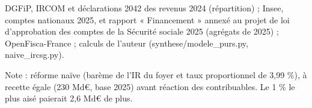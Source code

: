 DGFiP, IRCOM et déclarations 2042 des revenus 2024 (répartition) ; Insee, comptes nationaux 2025, et rapport « Financement » annexé au projet de loi d'approbation des comptes de la Sécurité sociale 2025 (agrégats de 2025) ; OpenFisca-France ; calculs de l'auteur (synthese/modele\_purs.py, naive\_ircsg.py).\par Note : réforme naïve (barème de l'IR du foyer et taux proportionnel de 3,99 \%), à recette égale (230 Md\euro{}, base 2025) avant réaction des contribuables. Le 1 \% le plus aisé paierait 2,6 Md\euro{} de plus.
